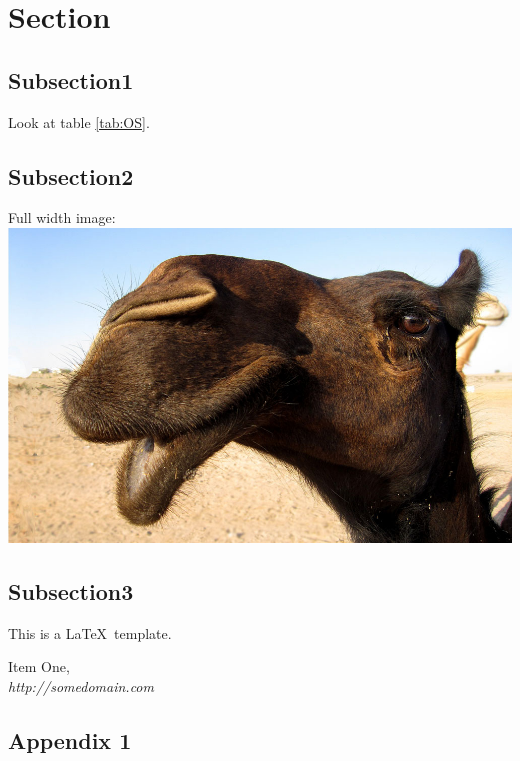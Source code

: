 \documentclass[12pt]{article} %
\begin{document}
\section{Section}
\subsection{Subsection1}
Look at table \ref{tab:OS}. 


\subsection{Subsection2}
Full width image:\\
\includegraphics[width=\textwidth]{camel}

\subsection{Subsection3}
This is a \LaTeX~template\cite{bibitem1}.


\begin{thebibliography}{99}
  Item One,\\
  \emph{http://somedomain.com}
\end{thebibliography}





\begin{appendices}
	\section{Appendix 1}
	
\end{appendices}
\end{document}
